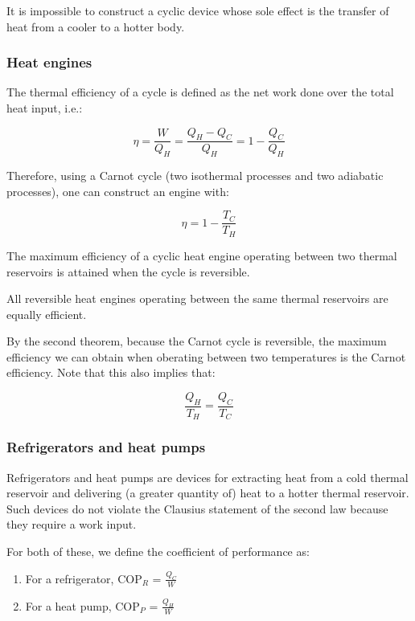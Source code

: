 \documentclass{article}
\begin{document}
\begin{theorem}
    It is impossible to construct a cyclic device whose sole effect is the transfer of heat from a cooler to a hotter body.
\end{theorem}

\subsubsection{Heat engines}

\begin{definition}
    The thermal efficiency of a cycle is defined as the net work done over the total heat input, i.e.:

    \[ \eta = \frac{W}{Q_H} = \frac{Q_H - Q_C}{Q_H} = 1 - \frac{Q_C}{Q_H} \]

    Therefore, using a Carnot cycle (two isothermal processes and two adiabatic processes), one can construct an engine with:

    \[ \eta = 1 - \frac{T_C}{T_H} \]
\end{definition}

\begin{theorem}
    The maximum efficiency of a cyclic heat engine operating between two thermal reservoirs is attained when the cycle is reversible.
\end{theorem}

\begin{theorem}
    All reversible heat engines operating between the same thermal reservoirs are equally efficient.
\end{theorem}

By the second theorem, because the Carnot cycle is reversible, the maximum efficiency we can obtain when oberating between two temperatures is the Carnot efficiency. Note that this also implies that:

\[ \frac{Q_H}{T_H} = \frac{Q_C}{T_C} \]

\subsubsection{Refrigerators and heat pumps}

Refrigerators and heat pumps are devices for extracting heat from a cold thermal reservoir and delivering (a greater quantity of) heat to a hotter thermal reservoir. Such devices do not violate the Clausius statement of the second law because they require a work input.

\begin{definition}
    For both of these, we define the coefficient of performance as:

    \begin{enumerate}
        \item For a refrigerator, COP$_R$ = $\frac{Q_C}{W}$
        \item For a heat pump, COP$_P$ = $\frac{Q_H}{W}$
    \end{enumerate}
\end{definition}
\end{document}
